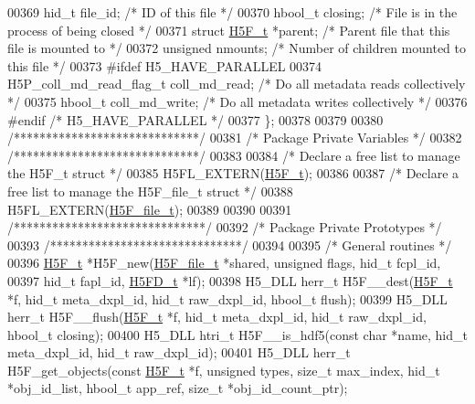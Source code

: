 \begin{DoxyCode}
00369     hid\_t               file\_id;        \textcolor{comment}{/* ID of this file              */}
00370     hbool\_t             closing;        \textcolor{comment}{/* File is in the process of being closed */}
00371     \textcolor{keyword}{struct }\hyperlink{struct_h5_f__t}{H5F\_t}        *parent;        \textcolor{comment}{/* Parent file that this file is mounted to */}
00372     \textcolor{keywordtype}{unsigned}            nmounts;        \textcolor{comment}{/* Number of children mounted to this file */}
00373 \textcolor{preprocessor}{#ifdef H5\_HAVE\_PARALLEL}
00374     H5P\_coll\_md\_read\_flag\_t coll\_md\_read;  \textcolor{comment}{/* Do all metadata reads collectively */}
00375     hbool\_t             coll\_md\_write;  \textcolor{comment}{/* Do all metadata writes collectively */}
00376 \textcolor{preprocessor}{#endif }\textcolor{comment}{/* H5\_HAVE\_PARALLEL */}\textcolor{preprocessor}{}
00377 \};
00378 
00379 
00380 \textcolor{comment}{/*****************************/}
00381 \textcolor{comment}{/* Package Private Variables */}
00382 \textcolor{comment}{/*****************************/}
00383 
00384 \textcolor{comment}{/* Declare a free list to manage the H5F\_t struct */}
00385 H5FL\_EXTERN(\hyperlink{struct_h5_f__t}{H5F\_t});
00386 
00387 \textcolor{comment}{/* Declare a free list to manage the H5F\_file\_t struct */}
00388 H5FL\_EXTERN(\hyperlink{struct_h5_f__file__t}{H5F\_file\_t});
00389 
00390 
00391 \textcolor{comment}{/******************************/}
00392 \textcolor{comment}{/* Package Private Prototypes */}
00393 \textcolor{comment}{/******************************/}
00394 
00395 \textcolor{comment}{/* General routines */}
00396 \hyperlink{struct_h5_f__t}{H5F\_t} *H5F\_new(\hyperlink{struct_h5_f__file__t}{H5F\_file\_t} *shared, \textcolor{keywordtype}{unsigned} flags, hid\_t fcpl\_id,
00397     hid\_t fapl\_id, \hyperlink{struct_h5_f_d__t}{H5FD\_t} *lf);
00398 H5\_DLL herr\_t H5F\_\_dest(\hyperlink{struct_h5_f__t}{H5F\_t} *f, hid\_t meta\_dxpl\_id, hid\_t raw\_dxpl\_id, hbool\_t flush);
00399 H5\_DLL herr\_t H5F\_\_flush(\hyperlink{struct_h5_f__t}{H5F\_t} *f, hid\_t meta\_dxpl\_id, hid\_t raw\_dxpl\_id, hbool\_t closing);
00400 H5\_DLL htri\_t H5F\_\_is\_hdf5(\textcolor{keyword}{const} \textcolor{keywordtype}{char} *name, hid\_t meta\_dxpl\_id, hid\_t raw\_dxpl\_id);
00401 H5\_DLL herr\_t H5F\_get\_objects(\textcolor{keyword}{const} \hyperlink{struct_h5_f__t}{H5F\_t} *f, \textcolor{keywordtype}{unsigned} types, \textcolor{keywordtype}{size\_t} max\_index, hid\_t *obj\_id\_list, 
      hbool\_t app\_ref, \textcolor{keywordtype}{size\_t} *obj\_id\_count\_ptr);

\end{DoxyCode}
